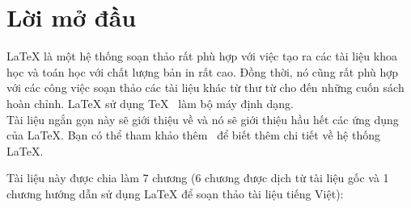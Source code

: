 

\chapter{Lời mở đầu}
\LaTeX{} \cite{manual} là một hệ thống soạn thảo rất phù hợp với
việc tạo ra các tài liệu khoa học và toán học với chất lượng bản
in rất cao. Đồng thời, nó cũng rất phù hợp với các công việc soạn
thảo các tài liệu khác từ thư từ cho đến những cuốn sách hoàn
chỉnh. \LaTeX{} sử dụng \TeX{}~\cite{texbook} làm bộ máy định
dạng.\\

Tài liệu ngắn gọn này sẽ giới thiệu về \LaTeXe{} và nó sẽ giới
thiệu hầu hết các ứng dụng của \LaTeX. Bạn có thể tham khảo
thêm~\cite{manual,companion} để biết thêm chi tiết về hệ thống
\LaTeX{}.

\bigskip
\noindent Tài liệu này được chia làm 7 chương (6 chương được dịch
từ tài liệu gốc và 1 chương hướng dẫn sử dụng \LaTeX{} để soạn thảo tài liệu tiếng Việt):


